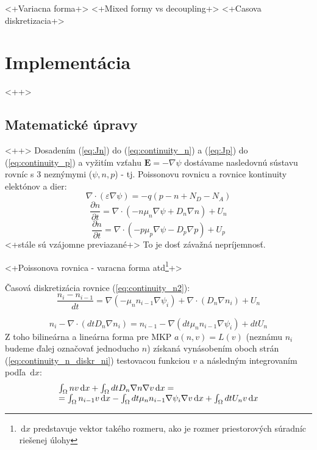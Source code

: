 \documentclass{eeict}
\newcommand{\dif}{\, \mathrm{d}}	%
\newcommand{\dxdtp}[2]{\frac{\partial #1}{\partial #2}}
\begin{document}
<+Variacna forma+>
<+Mixed formy vs decoupling+>
<+Casova diskretizacia+>

\section{Implementácia}<++>
\subsection{Matematické úpravy}\label{ch:implementacia__matematicke_upravy}<++>
Dosadením (\ref{eq:Jn}) do (\ref{eq:continuity_n}) a (\ref{eq:Jp}) do (\ref{eq:continuity_p}) a vyžitím vzťahu $\mathbf{E} = - \nabla \psi$ dostávame nasledovnú sústavu rovníc s 3 neznýmymi ($\psi, n, p$) - tj. Poissonovu rovnicu a rovnice kontinuity elektónov a dier:
\begin{equation}
	\nabla \cdot (\varepsilon \nabla \psi) = -q (p -n + N_D - N_A)
	\label{eq:poisson2}
\end{equation}
\begin{equation}
	\dxdtp{n}{t} = \nabla \cdot (-n \mu_n \nabla \psi + D_n \nabla n) + U_n
	\label{eq:continuity_n2}
\end{equation}
\begin{equation}
	\dxdtp{n}{t} = \nabla \cdot (-p \mu_p \nabla \psi - D_p \nabla p) + U_p
	\label{eq:continuity_p2}
\end{equation}
<+stále sú vzájomne previazané+> To je dosť závažná nepríjemnosť.

<+Poissonova rovnica - varacna forma atd\footnote{$\dif{x}$ predstavuje vektor takého rozmeru, ako je rozmer priestorových súradníc riešenej úlohy}+>

Časová diskretizácia rovnice (\ref{eq:continuity_n2}):
\begin{equation}
	\frac{n_{i} - n_{i-1}}{dt} = \nabla (-\mu_n n_{i-1} \nabla \psi_i) + \nabla \cdot \left( D_n \nabla n_i \right) + U_n
	\label{eq:continuity_n_diskr}
\end{equation}

\begin{equation}
	n_i - \nabla \cdot (dt D_n \nabla n_i) = n_{i-1} - \nabla (dt \mu_n n_{i-1} \nabla \psi_i) + dt U_n			
	\label{eq:continuity_n_diskr_ni}
\end{equation}
Z toho bilineárna a lineárna forma pre MKP $a(n, v) = L(v)$ (neznámu $n_i$ budeme ďalej označovať jednoducho $n$) získaná vynásobením oboch strán (\ref{eq:continuity_n_diskr_ni}) testovacou funkciou $v$ a následným integrovaním podľa $\dif{x}$:
\begin{equation}
	\begin{array}{l l}
		\int_{\Omega} n v \dif x + \int_{\Omega} dt D_n \nabla n \nabla v \dif x
		=\\
		= \int_{\Omega} n_{i-1} v \dif x - \int_{\Omega}dt \mu_n n_{i-1} \nabla \psi_i \nabla v \dif x + \int_{\Omega} dt U_n v \dif x
	\end{array}
	\label{eq:continuity_n_a_L}
\end{equation}
\end{document}
